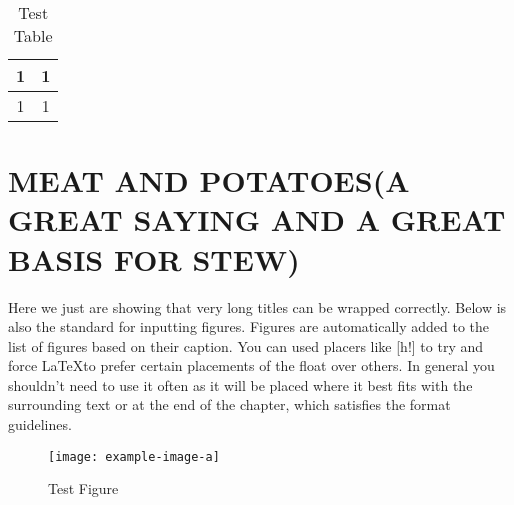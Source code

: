 \begin{body}
\begin{table}[h!]
	\begin{center}
		\begin{tabular}{|c|c|}
			\hline 
			1 & 1 \\ 
			\hline 
			1 & 1 \\ 
			\hline 
		\end{tabular}
	\end{center}
	\caption{Test Table}
	\label{table:test table}
\end{table}
 
\lipsum[1-2]


\chapter{MEAT AND POTATOES(A GREAT SAYING AND A GREAT BASIS FOR STEW)}
Here we just are showing that very long titles can be wrapped correctly. Below is also the standard for inputting figures. Figures are automatically added to the list of figures based on their caption. You can used placers like [h!] to try and force \LaTeX to prefer certain placements of the float over others. In general you shouldn't need to use it often as it will be placed where it best fits with the surrounding text or at the end of the chapter, which satisfies the format guidelines. 

\begin{figure}[h!]
	\begin{center}
		\texttt{[image: example-image-a]}
	\end{center}
	\caption{Test Figure}
	\label{fig:test figure}
\end{figure}

\lipsum[1]


\renewcommand{\bibsection}{\topskip=1in\chapter*{REFERENCES}\topskip=0in \addcontentsline{toc}{chapter}{REFERENCES}}



\begin{appendices}


\end{appendices}
\end{body}
